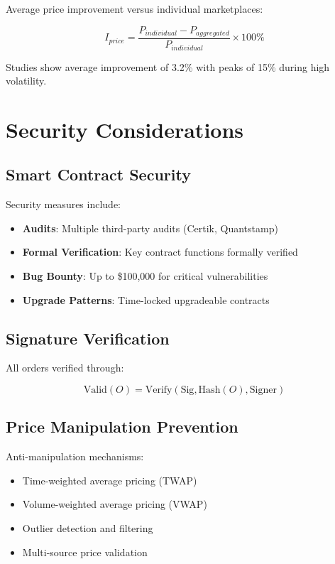 \documentclass[11pt,a4paper]{article}
\begin{document}
Average price improvement versus individual marketplaces:

\begin{equation}
I_{price} = \frac{P_{individual} - P_{aggregated}}{P_{individual}} \times 100\%
\end{equation}

Studies show average improvement of 3.2\% with peaks of 15\% during high volatility.

\section{Security Considerations}

\subsection{Smart Contract Security}

Security measures include:

\begin{itemize}
\item \textbf{Audits}: Multiple third-party audits (Certik, Quantstamp)
\item \textbf{Formal Verification}: Key contract functions formally verified
\item \textbf{Bug Bounty}: Up to \$100,000 for critical vulnerabilities
\item \textbf{Upgrade Patterns}: Time-locked upgradeable contracts
\end{itemize}

\subsection{Signature Verification}

All orders verified through:

\begin{equation}
\text{Valid}(O) = \text{Verify}(\text{Sig}, \text{Hash}(O), \text{Signer})
\end{equation}

\subsection{Price Manipulation Prevention}

Anti-manipulation mechanisms:

\begin{itemize}
\item Time-weighted average pricing (TWAP)
\item Volume-weighted average pricing (VWAP)
\item Outlier detection and filtering
\item Multi-source price validation
\end{itemize}
\end{document}
